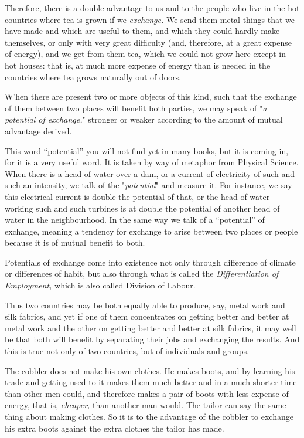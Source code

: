 \documentclass{book}
\begin{document}
Therefore, there is a double advantage to us and to the people who live in the hot countries where tea is grown if we \emph{exchange.} We send them metal things that we have made and which are useful to them, and which they could hardly make themselves, or only with very great difficulty (and, therefore, at a great expense of energy), and we get from them tea, which we could not grow here except in hot houses: that is, at much more expense of energy than is needed in the countries where tea grows naturally out of doors.

W’hen there are present two or more objects of this kind, such that the exchange of them between two places will benefit both parties, we may speak of "\emph{a potential of exchange,}" stronger or weaker according to the amount of mutual advantage derived.

This word “potential” you will not find yet in many books, but it is coming in, for it is a very useful word. It is taken by way of metaphor from Physical Science. When there is a head of water over a dam, or a current of electricity of such and such an intensity, we talk of the "\emph{potential}" and measure it. For instance, we say this electrical current is double the potential of that, or the head of water working such and such turbines is at double the potential of another head of water in the neighbourhood. In the same way we talk of a “potential” of exchange, meaning a tendency for exchange to arise between two places or people because it is of mutual benefit to both.

Potentials of exchange come into existence not only through difference of climate or differences of habit, but also through what is called the \emph{Differentiation of Employment,} which is also called Division of Labour.

Thus two countries may be both equally able to produce, say, metal work and silk fabrics, and yet if one of them concentrates on getting better and better at metal work and the other on getting better and better at silk fabrics, it may well be that both will benefit by separating their jobs and exchanging the results. And this is true not only of two countries, but of individuals and groups.

The cobbler does not make his own clothes. He makes boots, and by learning his trade and getting used to it makes them much better and in a much shorter time than other men could, and therefore makes a pair of boots with less expense of energy, that is, \emph{cheaper,} than another man would. The tailor can say the same thing about making clothes. So it is to the advantage of the cobbler to exchange his extra boots against the extra clothes the tailor has made.
\end{document}
